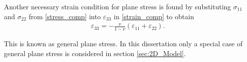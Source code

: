 \documentclass[../../main.tex]{subfiles}
\begin{document}
Another necessary strain condition for plane stress is found by substituting $\sigma_{11}$ and $\sigma_{22}$ from \eqref{stress_comp} into $\varepsilon_{33}$ in \eqref{strain_comp} to obtain
\begin{eqnarray}
	\varepsilon_{33} = -\frac{\nu}{1-\nu} (\varepsilon_{11} + \varepsilon_{22}).\label{plane_stress_neseccary_condition}
\end{eqnarray} 

This is known as general plane stress. In this dissertation only a special case of general plane stress is considered in section \ref{sec:2D_Model}.
\end{document}
